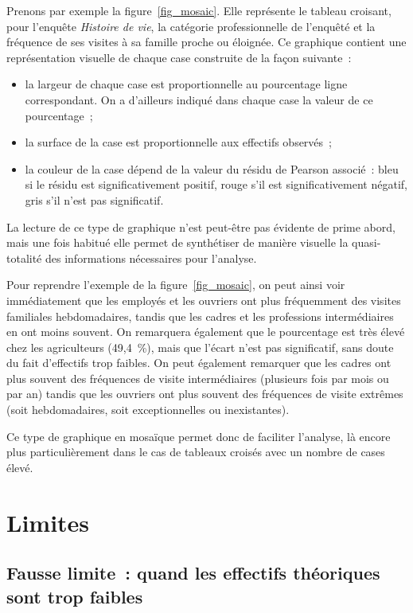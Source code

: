 \documentclass[a4paper,10pt,twoside,francais]{report}
\begin{document}
Prenons par exemple la figure~\vref{fig_mosaic}. Elle représente le
tableau croisant, pour l'enquête \textit{Histoire de vie}, la
catégorie professionnelle de l'enquêté et la fréquence de ses visites
à sa famille proche ou éloignée. Ce graphique contient une
représentation visuelle de chaque case construite de la façon
suivante~:

\begin{itemize}
\item la largeur de chaque case est proportionnelle au pourcentage
  ligne correspondant. On a d'ailleurs indiqué dans chaque case la
  valeur de ce pourcentage~;
\item la surface de la case est proportionnelle aux effectifs observés~;
\item la couleur de la case dépend de la valeur du résidu de Pearson
  associé~: bleu si le résidu est significativement positif, rouge
  s'il est significativement négatif, gris s'il n'est pas
  significatif.
\end{itemize}

La lecture de ce type de graphique n'est peut-être pas évidente de
prime abord, mais une fois habitué elle permet de synthétiser de
manière visuelle la quasi-totalité des informations nécessaires pour
l'analyse.

Pour reprendre l'exemple de la figure~\ref{fig_mosaic}, on peut ainsi
voir immédiatement que les employés et les ouvriers ont plus
fréquemment des visites familiales hebdomadaires, tandis que les
cadres et les professions intermédiaires en ont moins souvent. On
remarquera également que le pourcentage est très élevé chez les
agriculteurs (49,4~\%), mais que l'écart n'est pas significatif, sans
doute du fait d'effectifs trop faibles. On peut également remarquer
que les cadres ont plus souvent des fréquences de visite
intermédiaires (plusieurs fois par mois ou par an) tandis que les
ouvriers ont plus souvent des fréquences de visite \og extrêmes \fg{}
(soit hebdomadaires, soit exceptionnelles ou inexistantes).

Ce type de graphique en mosaïque permet donc de faciliter l'analyse,
là encore plus particulièrement dans le cas de tableaux croisés avec
un nombre de cases élevé.


\chapter{Limites}
\label{sec-limites}

\section{Fausse limite~: quand les effectifs théoriques sont trop faibles}
\label{ssec-efffaibles}
\end{document}
